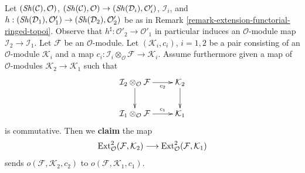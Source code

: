 \begin{remark}
\label{remark-obstruction-extension-functorial-ringed-topoi}
Let $(\mathop{\mathit{Sh}}\nolimits(\mathcal{C}), \mathcal{O})$,
$(\mathop{\mathit{Sh}}\nolimits(\mathcal{C}), \mathcal{O}) \to (\mathop{\mathit{Sh}}\nolimits(\mathcal{D}_i), \mathcal{O}'_i)$,
$\mathcal{I}_i$, and $h : (\mathop{\mathit{Sh}}\nolimits(\mathcal{D}_1), \mathcal{O}'_1) \to
(\mathop{\mathit{Sh}}\nolimits(\mathcal{D}_2), \mathcal{O}'_2)$ be as in
Remark \ref{remark-extension-functorial-ringed-topoi}.
Observe that $h^\sharp : \mathcal{O}'_2 \to \mathcal{O}'_1$
in particular induces an $\mathcal{O}$-module map
$\mathcal{I}_2 \to \mathcal{I}_1$.
Let $\mathcal{F}$ be an $\mathcal{O}$-module.
Let $(\mathcal{K}_i, c_i)$, $i = 1, 2$ be a pair
consisting of an $\mathcal{O}$-module $\mathcal{K}_i$ and a map
$c_i : \mathcal{I}_i \otimes_\mathcal{O} \mathcal{F} \to
\mathcal{K}_i$. Assume furthermore given a map
of $\mathcal{O}$-modules $\mathcal{K}_2 \to \mathcal{K}_1$
such that
$$
\xymatrix{
\mathcal{I}_2 \otimes_\mathcal{O} \mathcal{F}
\ar[r]_-{c_2} \ar[d] &
\mathcal{K}_2 \ar[d] \\
\mathcal{I}_1 \otimes_\mathcal{O} \mathcal{F}
\ar[r]^-{c_1} &
\mathcal{K}_1
}
$$
is commutative. Then we {\bf claim} the map
$$
\mathop{\mathrm{Ext}}\nolimits^2_\mathcal{O}(\mathcal{F}, \mathcal{K}_2)
\longrightarrow
\mathop{\mathrm{Ext}}\nolimits^2_\mathcal{O}(\mathcal{F}, \mathcal{K}_1)
$$
sends $o(\mathcal{F}, \mathcal{K}_2, c_2)$ to
$o(\mathcal{F}, \mathcal{K}_1, c_1)$.


\end{remark}
